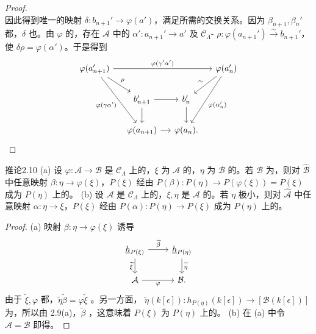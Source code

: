\begin{proof}
\[\]
因此得到唯一的映射 $\delta:b_{n+1}'\to\varphi(a')$，满足所需的交换关系。因为 $\beta_{n+1},\beta_n'$ 都，$\delta$ 也。由 $\varphi$ 的，存在 $\mathcal A$ 中的 $\alpha':a_{n+1}'\to a'$ 及 $\mathcal C_\Lambda$- $\rho:\varphi(a_{n+1}')\xrightarrow\sim b_{n+1}'$，使 $\delta\rho=\varphi(\alpha')$。于是得到
\[
\begin{tikzcd}[column sep=small]
\varphi(a_{n+1}')\arrow[rrr,"\varphi(\gamma'\alpha')"]\arrow[dr,"\rho"]\arrow[ddr,"\varphi(\gamma\alpha')"']&&&\varphi(a_n')\arrow[dl,"\sim"']\arrow[ddl,"\varphi(\alpha_n')"]\\
&b_{n+1}'\arrow[r]\arrow[d]&b_n'\arrow[d]&\\
&\varphi(a_{n+1})\arrow[r]&\varphi(a_n).&
\end{tikzcd}
\]
\end{proof}
\begin{SGAresult}{推论}{2.10}
(a) 设 $\varphi:\mathcal A\to\mathcal B$ 是 $\mathcal C_\Lambda$ 上的，$\xi$ 为 $\mathcal A$ 的，$\eta$ 为 $\mathcal B$ 的。若 $\mathcal B$ 为，则对 $\widehat{\mathcal B}$ 中任意映射 $\beta:\eta\to\varphi(\xi)$，$P(\xi)$ 经由 $P(\beta):P(\eta)\to P(\varphi(\xi))=P(\xi)$ 成为 $P(\eta)$ 上的。
(b) 设 $\mathcal A$ 是 $\mathcal C_\Lambda$ 上的，$\xi,\eta$ 是 $\mathcal A$ 的。若 $\eta$ 极小，则对 $\widehat{\mathcal A}$ 中任意映射 $\alpha:\eta\to\xi$，$P(\xi)$ 经由 $P(\alpha):P(\eta)\to P(\xi)$ 成为 $P(\eta)$ 上的。
\end{SGAresult}
\begin{proof}
(a) 映射 $\beta:\eta\to\varphi(\xi)$ 诱导
\[
\begin{tikzcd}
\underline h_{P(\xi)}\arrow[r,"\widetilde\beta"]\arrow[d,"\widetilde\xi"']&\underline h_{P(\eta)}\arrow[d,"\widetilde\eta"]\\
\mathcal A\arrow[r,"\varphi"']&\mathcal B.
\end{tikzcd}
\]
由于 $\widetilde\xi,\varphi$ 都，$\widetilde\eta\widetilde\beta=\varphi\widetilde\xi$ 。另一方面，
$\widetilde\eta(k[\epsilon]):h_{P(\eta)}(k[\epsilon])\to[\mathcal B(k[\epsilon])]$ 为，所以由 2.9(a)，$\widetilde\beta$ ，这意味着 $P(\xi)$ 为 $P(\eta)$ 上的。
(b) 在 (a) 中令 $\mathcal A=\mathcal B$ 即得。
\end{proof}
